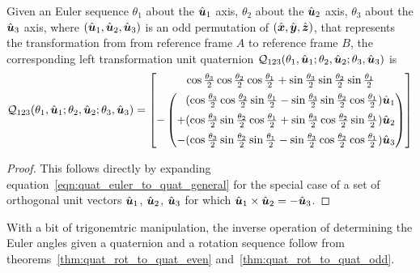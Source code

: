 \begin{theorem}\label{thm:quat_rot_to_quat_odd}
Given an Euler sequence
$\theta_1$ about the $\hat{\boldsymbol{u}}_1$ axis,
$\theta_2$ about the $\hat{\boldsymbol{u}}_2$ axis,
$\theta_3$ about the $\hat{\boldsymbol{u}}_3$ axis,
where $(\hat{\boldsymbol{u}}_1, \hat{\boldsymbol{u}}_2, \hat{\boldsymbol{u}}_3)$ is an
odd permutation of $(\hat{\boldsymbol{x}}, \hat{\boldsymbol{y}}, \hat{\boldsymbol{z}})$,
that represents the transformation from
from reference frame $A$ to reference frame $B$,
the corresponding left transformation unit quaternion
$\mathcal{Q}_{123}
  (\theta_{1}, \hat{\boldsymbol{u}}_1; \theta_{2}, \hat{\boldsymbol{u}}_2; \theta_{3}, \hat{\boldsymbol{u}}_3)$
is
\begin{equation}
  \quat{Q}_{123}
    (\theta_{1}, \vhat u_1; \theta_{2}, \vhat u_2; \theta_{3}, \vhat u_3) =
       \quatsv[5pt]
        {\cos\frac{\theta_3}2 \cos\frac{\theta_2}2 \cos\frac{\theta_1}2
          + \sin\frac{\theta_3}2 \sin\frac{\theta_2}2 \sin\frac{\theta_1}2}
        {
          - \begin{pmatrix}
          \phantom{+}
            (\cos\frac{\theta_3}2 \cos\frac{\theta_2}2 \sin\frac{\theta_1}2
            - \sin\frac{\theta_3}2 \sin\frac{\theta_2}2 \cos\frac{\theta_1}2)
            \vhat u_1 \\[5pt]
          +
            (\cos\frac{\theta_3}2 \sin\frac{\theta_2}2 \cos\frac{\theta_1}2
            + \sin\frac{\theta_3}2 \cos\frac{\theta_2}2 \sin\frac{\theta_1}2)
            \vhat u_2 \\[5pt]
          -
           (\cos\frac{\theta_3}2 \sin\frac{\theta_2}2 \sin\frac{\theta_1}2
            - \sin\frac{\theta_3}2 \cos\frac{\theta_2}2 \cos\frac{\theta_1}2)
            \vhat u_3
           \end{pmatrix}}
   \label{eqn:quat_rot_to_quat_odd}
\end{equation}
\end{theorem}
\begin{proof}
This follows directly by expanding
equation~\eqref{eqn:quat_euler_to_quat_general}
for the special case of a set of orthogonal unit vectors
$\hat{\boldsymbol{u}}_1$, $\hat{\boldsymbol{u}}_2$, $\hat{\boldsymbol{u}}_3$
for which $\hat{\boldsymbol{u}}_1 \times \hat{\boldsymbol{u}}_2 = - \hat{\boldsymbol{u}}_3$.
\end{proof}

With a bit of trigonemtric manipulation,
the inverse operation of determining the Euler angles given a quaternion
and a rotation sequence follow from theorems~\ref{thm:quat_rot_to_quat_even}
and~\ref{thm:quat_rot_to_quat_odd}.

